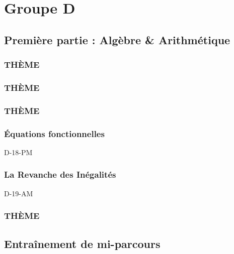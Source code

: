 \documentclass[poly,trombi]{valbonne}
\begin{document}






\chapter{Groupe D}

\minitoc \clearpage

\section{Première partie : Algèbre \& Arithmétique}


\subsection{THÈME}


\subsection{THÈME}


\subsection{THÈME}


\subsection{Équations fonctionnelles}

{D-18-PM}

\subsection{La Revanche des Inégalités}

{D-19-AM}

\subsection{THÈME}



\section{Entraînement de mi-parcours}
\end{document}
